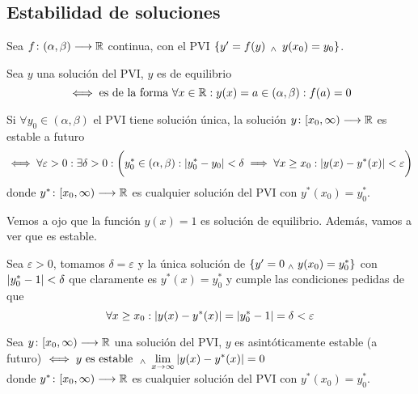 \subsection{Estabilidad de soluciones}

Sea $f \colon (\alpha,\beta) \longrightarrow \mathbb{R}$ continua, con el PVI $\{y'=f(y) \, \; _{\wedge} \; \, y(x_0) = y_0\}$.
\begin{defn}[Equilibrio]
	Sea $y$ una solución del PVI, $y$ es de equilibrio
	\[\iff \text{es de la forma } \forall x \in \mathbb{R} : y(x)=a \in (\alpha, \beta) : f(a) = 0\]
\end{defn}

\begin{defn}[Estabilidad]
	Si $\forall y_0 \in (\alpha, \beta)$ el PVI tiene solución única, la solución $y \colon [x_0, \infty) \longrightarrow \mathbb{R}$ es estable a futuro
	\[\iff \forall \varepsilon >0 : \exists \delta > 0 : \bigg(y_0^*\in (\alpha, \beta) : \left|y_0^*-y_0\right| < \delta \implies \forall x \geq x_0 :\left|y(x)-y^*(x)\right|<\varepsilon\bigg)\]
	donde $y^* \colon [x_0, \infty) \longrightarrow \mathbb{R}$ es cualquier solución del PVI con $y^*(x_0)=y_0^*$.
\end{defn}

\begin{ejem}[$\{y'=0 \we y(x_0)=1\}$]
	Vemos a ojo que la función $y(x)=1$ es solución de equilibrio. Además, vamos a ver que es estable.

	Sea $\varepsilon > 0$, tomamos $\delta = \varepsilon$ y la única solución de $\{y'=0 \; _{\wedge} \; y(x_0) = y_0^*\}$ con $\left|y_0^* -1\right| < \delta$ que claramente es $y^*(x) = y_0^*$ y cumple las condiciones pedidas de que \[\forall x \geq x_0 : \left|y(x) - y^*(x)\right| = \left|y_0^* - 1\right| = \delta < \varepsilon\]
\end{ejem}

\begin{defn}
	Sea $y \colon [x_0, \infty) \longrightarrow \mathbb{R}$ una solución del PVI, $y$ es asintóticamente estable (a futuro) $\displaystyle \iff y \text{ es estable } \; _{\wedge} \; \lim_{x\to \infty}\left|y(x)-y^*(x)\right|=0$ \\
	donde $y^* \colon [x_0, \infty) \longrightarrow \mathbb{R}$ es cualquier solución del PVI con $y^*(x_0)=y_0^*$.
\end{defn}


